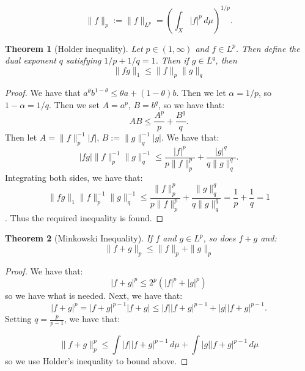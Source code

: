 \documentclass{article}
\newtheorem{theorem}{Theorem}
\theoremstyle{definition}
\numberwithin{theorem}{section}
\numberwithin{equation}{section}
\begin{document}
\begin{equation}
	\|f \|_p := \|f\|_{L^p} = \left(\int_X |f|^p \,  d\mu \right)^{1/p}.
\end{equation}


\begin{theorem}[Holder inequality]
	Let $p \in (1, \infty)$ and $f \in L^p$. Then define the dual exponent $q$ satisfying $1/p + 1/q = 1$. Then if $g \in L^q$, then 
	\begin{equation}
		\| fg \|_1 \leq \|f \|_p \| g \|_q
	\end{equation}
\end{theorem}
\begin{proof}
	We have that $a^\theta b^{1-\theta} \leq \theta a + (1 - \theta) b$.
	Then we let $\alpha = 1/p$, so $1 - \alpha = 1/q$. Then we set $A = a^p$, $B = b^q$, so we have that:
	\begin{equation}
		AB \leq \frac{A^p}{p} + \frac{B^q}{q}.
	\end{equation}
	Then let $A = \|f \|_p^{-1} |f|$, $B := \|g \|_q^{-1} |g|$. We have that:
	\begin{equation}
		|fg| \|f \|_p^{-1} \|g \|_q^{-1} \leq \frac{|f|^p}{p \|f\|_p^p} + \frac{|g|^q}{q \| g \|_q^q}.
	\end{equation}
	Integrating both sides, we have that:
	\begin{equation}
		\|fg \|_1 \|f \|_p^{-1} \|g \|_q^{-1} \leq \frac{\|f \|_p^p}{p \|f \|_p^p} + \frac{\|g \|_q^q}{q \|g \|_q^q} = \frac{1}{p} + \frac{1}{q} = 1 
	\end{equation}.
	Thus the required inequality is found. 
\end{proof}

\begin{theorem}[Minkowski Inequality]
	If $f$ and $g \in L^p$, so does $f + g$ and:
	\begin{equation}
	\| f + g \|_p \leq \|f \|_p + \| g \|_p
\end{equation}
\end{theorem}
\begin{proof}
	We have that:
	\begin{equation}
		|f + g|^p \leq 2^p (|f|^p + |g|^p)
	\end{equation}
	so we have what is needed. 
	Next, we have that:
	\begin{equation}
		|f + g|^p = |f + g|^{p-1} |f + g| \leq |f| |f + g|^{p-1} + |g| |f + g|^{p-1}.
	\end{equation}
	Setting $q = \frac{p}{p-1}$, we have that:
	
	\begin{equation}
		\| f + g\|_p^p \leq \int |f| |f + g|^{p-1}  \, d\mu +  \int |g| |f + g|^{p-1} \, d\mu
	\end{equation}
	so we use Holder's inequality to bound above. 
\end{proof}
\end{document}
